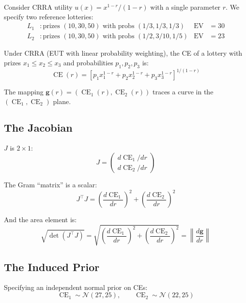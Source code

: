 \documentclass[11pt,a4paper]{article}
\theoremstyle{definition}
\newcommand{\Normal}{\mathcal{N}}
\DeclareMathOperator{\CE}{CE}
\begin{document}
Consider CRRA utility $u(x) = x^{1-r}/(1-r)$ with a single parameter $r$.
We specify two reference lotteries:
\begin{align}
    L_1 &: \text{prizes } (10, 30, 50) \text{ with probs } (1/3, 1/3, 1/3)
    & \text{EV} &= 30 \\
    L_2 &: \text{prizes } (10, 30, 50) \text{ with probs } (1/2, 3/10, 1/5)
    & \text{EV} &= 23
\end{align}

Under CRRA (EUT with linear probability weighting), the CE of a lottery with
prizes $x_1 \leq x_2 \leq x_3$ and probabilities $p_1, p_2, p_3$ is:
\begin{equation}
    \CE(r) = \left[p_1 x_1^{1-r} + p_2 x_2^{1-r} + p_3 x_3^{1-r}
    \right]^{1/(1-r)}
\end{equation}

The mapping $\mathbf{g}(r) = (\CE_1(r), \CE_2(r))$ traces a curve in the
$(\CE_1, \CE_2)$ plane.

\subsection{The Jacobian}

$J$ is $2 \times 1$:
\begin{equation}
    J = \begin{pmatrix} d\CE_1/dr \\ d\CE_2/dr \end{pmatrix}
\end{equation}

The Gram ``matrix'' is a scalar:
\begin{equation}
    J^\top J = \left(\frac{d\CE_1}{dr}\right)^{\!2}
    + \left(\frac{d\CE_2}{dr}\right)^{\!2}
\end{equation}

And the area element is:
\begin{equation}
    \sqrt{\det(J^\top J)} = \sqrt{\left(\frac{d\CE_1}{dr}\right)^{\!2}
    + \left(\frac{d\CE_2}{dr}\right)^{\!2}}
    = \left\|\frac{d\mathbf{g}}{dr}\right\|
\end{equation}

\subsection{The Induced Prior}

Specifying an independent normal prior on CEs:
\begin{equation}
    \CE_1 \sim \Normal(27, 25), \qquad \CE_2 \sim \Normal(22, 25)
\end{equation}
\end{document}
